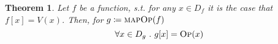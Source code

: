 \documentclass{article}
\newtheorem{theorem}{Theorem}[section]
\newtheorem{lemma}[theorem]{Lemma}
\newcommand{\iteDef}[4]{
  #1 \coloneqq \left\{
\begin{array}{ll}
      #2 &; #3 \\
      #4 &; \text{otherwise}\\
\end{array} 
\right. 
}
\newcommand{\op}{\textsc{Op}}
\newcommand{\mop}{\textsc{mapOp}}
\newcommand{\mapg}{\textsc{mapG}}
\begin{document}





\begin{theorem}\label{thm}
Let $f$ be a function, s.t. for any $x \in D_f$ it is the case that $f[x] = V(x)$. Then, for
$g \coloneqq \mop(f)$
\[
\forall x \in D_g \ .\ g[x] = \op(x)
\]
\end{theorem}
\end{document}
